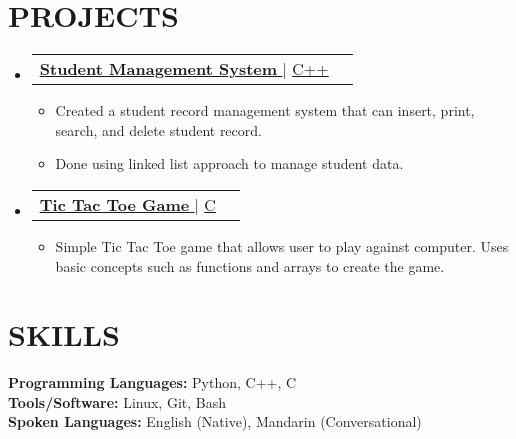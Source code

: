 \documentclass[letterpaper,11pt]{article}
\makeatletter
\newcommand{\resumeItem}[1]{
  \item\small{
    {#1 \vspace{-2pt}}
  }
}
\newcommand{\resumeProjectHeading}[2]{
    \item
    \begin{tabular*}{1.001\textwidth}{l@{\extracolsep{\fill}}r}
      \small#1 & \textbf{\small #2}\\
    \end{tabular*}\vspace{-7pt}
}
\newcommand{\resumeSubHeadingListStart}{\begin{itemize}[leftmargin=0.0in, label={}]}
\newcommand{\resumeSubHeadingListEnd}{\end{itemize}}
\newcommand{\resumeItemListStart}{\begin{itemize}}
\newcommand{\resumeItemListEnd}{\end{itemize}\vspace{-5pt}}
\makeatother
\begin{document}
\section{PROJECTS}
    \resumeSubHeadingListStart
       \resumeProjectHeading
          {\href{https://github.com/jamesyoung-15/cpp_practice/tree/main/Student_Management}{\textbf{\large{\underline{Student Management System}}} \href{Project Link}{\raisebox{-0.1\height}\faExternalLink }} $|$ \large{\underline{C++}}}{}
          \resumeItemListStart
          \vspace{3pt}
            \resumeItem{\normalsize{Created a student record management system that can insert, print, search, and delete student record.}}
            \resumeItem{\normalsize{Done using linked list approach to manage student data.}}
          \resumeItemListEnd 
          
      \resumeProjectHeading
          {\href{https://github.com/jamesyoung-15/tic_tac_toe}{\textbf{\large{\underline{Tic Tac Toe Game}}} \href{Project Link}{\raisebox{-0.1\height}\faExternalLink }} $|$ \large{\underline{C}}}{}
          \resumeItemListStart
          \vspace{3pt}
            \resumeItem{\normalsize{Simple Tic Tac Toe game that allows user to play against computer. Uses basic concepts such as functions and arrays to create the game.}}
          \resumeItemListEnd
          
          \resumeSubHeadingListEnd
\vspace{3pt}

%


\section{SKILLS}
 \begin{itemize}[leftmargin=0.15in, label={}]
    \small{\item{
     \textbf{\normalsize{Programming Languages:}}{ \normalsize{Python, C++, C}} \\
     \vspace{1pt}
     \textbf{\normalsize{Tools/Software:}}{\normalsize{ Linux, Git, Bash}} \\
     \vspace{1pt}
     \textbf{\normalsize{Spoken Languages:}}{\normalsize{ English (Native), Mandarin (Conversational)}} \\
    }}
 \end{itemize}
\vspace{1pt}
\end{document}
